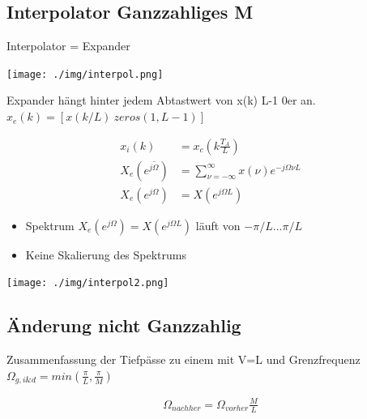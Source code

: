 \documentclass[10pt,a4paper]{article}
\begin{document}
\subsection{Interpolator Ganzzahliges M}
Interpolator = Expander
  \begin{center}
      \texttt{[image: ./img/interpol.png]}
  \end{center}
Expander hängt hinter jedem Abtastwert von x(k) L-1 0er an.
$x_e(k)= [x(k/L) \ zeros(1,L-1)]$
  \begin{mdframed}[style=exercise]
    \begin{align}
        x_i(k)&=x_c(k\frac{T_A}{L})\\
        X_e(e^{j\tilde{\Omega}})&=\sum_{\nu=-\infty}^{\infty} x(\nu)e^{-j\Omega\nu L}\\
        X_e(e^{j\Omega}) &=X(e^{j\Omega L})
    \end{align}
  \end{mdframed}
  \begin{itemize}
    \item Spektrum $X_e(e^{j\Omega}) =X(e^{j\Omega L})$ läuft von $-\pi/L ...\pi/L$
    \item Keine Skalierung des Spektrums 
  \end{itemize}
  \begin{center}
      \texttt{[image: ./img/interpol2.png]}
  \end{center}
\subsection{Änderung nicht Ganzzahlig}
Zusammenfassung der Tiefpässe zu einem mit V=L und Grenzfrequenz $\Omega_{g,i\&d}=min(\frac{\pi}{L}, \frac{\pi}{M})$
  \begin{mdframed}[style=exercise]
    \begin{align}
        \Omega_{nachher}=\Omega_{vorher}\frac{M}{L}
    \end{align}
  \end{mdframed}

\end{document}
